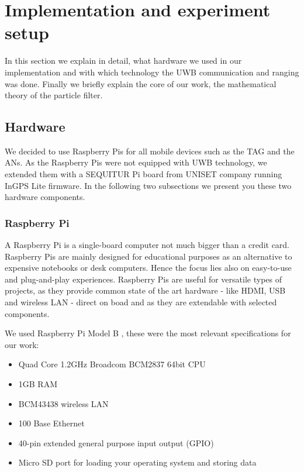 
\chapter{Implementation and experiment setup} %

\label{Chapter4} %
In this section we explain in detail, what hardware we used in our implementation and with which technology the UWB communication and ranging was done. Finally we briefly explain the core of our work, the mathematical theory of the particle filter.


\section{Hardware}
We decided to use Raspberry Pis for all mobile devices such as the TAG and the ANs. As the Raspberry Pis were not equipped with UWB technology, we extended them with a SEQUITUR Pi board from UNISET company running InGPS Lite firmware. In the following two subsections we present you these two hardware components.


\subsection{Raspberry Pi}
A Raspberry Pi is a single-board computer not much bigger than a credit card. Raspberry Pis are mainly designed for educational purposes as an alternative to expensive notebooks or desk computers. Hence the focus lies also on easy-to-use and plug-and-play experiences. Raspberry Pis are useful for versatile types of projects, as they provide common state of the art hardware - like HDMI, USB and wireless LAN - direct on boad and as they are extendable with selected components.

We used Raspberry Pi Model B \cite{Raspberry}, these were the most relevant specifications for our work:
\begin{itemize}
\item Quad Core 1.2GHz Broadcom BCM2837 64bit CPU
\item 1GB RAM
\item BCM43438 wireless LAN
\item 100 Base Ethernet
\item 40-pin extended general purpose input output (GPIO)
\item Micro SD port for loading your operating system and storing data
\end{itemize}


